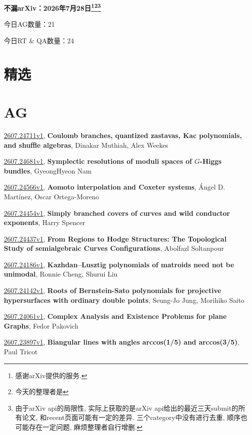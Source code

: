 \documentclass[9pt, a4paper]{article}
\theoremstyle{plain}
\theoremstyle{definition}
\theoremstyle{remark}
\newcommand{\arxiv}[3]{\href{https://arxiv.org/abs/#1}{#1}, \textbf{\textcolor{arxivblue}{#2}}, #3}
\newcommand{\AGnumber}{21}
\newcommand{\RTQAnumber}{24}
\newcommand{\NewestDate}{2026年7月28日}
\newcommand{\todayarXiver}{} %
\begin{document}
\begin{center}
    \Huge\textbf{不漏arXiv：\NewestDate\footnote{感谢arXiv提供的服务.}\footnote{今天的整理者是\todayarXiver}\footnote{由于arXiv api的局限性, 实际上获取的是arXiv api给出的最近三天submit的所有论文, 和recent页面可能有一定的差异. 三个category中没有进行去重, 顺序也可能存在一定问题, 麻烦整理者自行增删.}} \\
\end{center}

\setcounter{section}{-1}

\begin{center}
    今日AG数量：\AGnumber
    
    今日RT \& QA数量：\RTQAnumber
    
\end{center}


\section{精选}


\section{AG}
\arxiv{2607.24711v1}{Coulomb branches, quantized zastavas, Kac polynomials, and shuffle algebras}{Dinakar Muthiah, Alex Weekes}

\arxiv{2607.24681v1}{Symplectic resolutions of moduli spaces of $G$-Higgs bundles}{GyeongHyeon Nam}

\arxiv{2607.24566v1}{Aomoto interpolation and Coxeter systems}{Ángel D. Martínez, Oscar Ortega-Moreno}

\arxiv{2607.24454v1}{Simply branched covers of curves and wild conductor exponents}{Harry Spencer}

\arxiv{2607.24437v1}{From Regions to Hodge Structures: The Topological Study of semialgebraic Curves Configurations}{Abolfazl Soltanpour}

\arxiv{2607.24186v1}{Kazhdan--Lusztig polynomials of matroids need not be unimodal}{Ronnie Cheng, Shurui Liu}

\arxiv{2607.24142v1}{Roots of Bernstein-Sato polynomials for projective hypersurfaces with ordinary double points}{Seung-Jo Jung, Morihiko Saito}

\arxiv{2607.24061v1}{Complex Analysis and Existence Problems for plane Graphs}{Fedor Pakovich}

\arxiv{2607.23897v1}{Biangular lines with angles arccos(1/5) and arccos(3/5)}{Paul Tricot}
\end{document}
